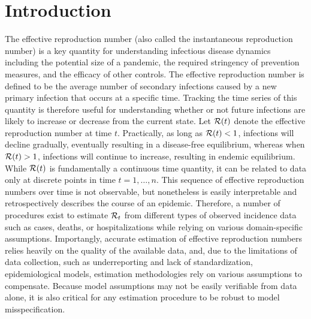 \section{Introduction}
\label{sec:intro}

The effective reproduction number (also called the instantaneous reproduction
number) is a key quantity for understanding infectious disease dynamics including
the potential size of a pandemic, the required stringency of prevention measures,
and the efficacy of other controls. 
The effective reproduction number is defined to be the average number of
secondary infections caused by a new primary infection that occurs at a specific
time. Tracking the time series of this quantity
is therefore useful for understanding whether or not future infections are
likely to increase or decrease from the current state.
Let $\mathcal{R}(t)$ denote the effective reproduction number at time $t$. Practically,
as long as $\mathcal{R}(t) < 1$, infections will decline gradually, eventually
resulting in a disease-free equilibrium, whereas when $\mathcal{R}(t)
> 1$, infections will continue to increase, resulting in endemic
equilibrium. 
%
While $\mathcal{R}(t)$ is fundamentally a continuous time quantity, it can be related
to data only at discrete points in time $t = 1,\ldots,n$.
This sequence of effective reproduction numbers over time is not observable, but
nonetheless is easily interpretable and retrospectively describes the course of
an epidemic. Therefore, a number of procedures exist to estimate $\mathcal{R}_t$ from
different types of observed incidence data such as cases, deaths, or
hospitalizations while relying on various domain-specific assumptions.
Importangly, accurate estimation of effective reproduction numbers relies
heavily on the quality of the available data, and, due to the limitations of
data collection, such as underreporting and lack of standardization,
epidemiological models, estimation methodologies rely on various assumptions to
compensate. Because model assumptions may not be easily verifiable from data
alone, it is also critical for any estimation procedure to be robust to model
misspecification. 

